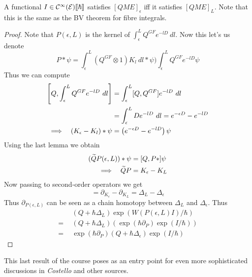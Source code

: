\begin{prop}
  A functional $I \in \mathcal{C}^{\infty}({\mathcal{E}})\llbracket\hbar\rrbracket$ satisfies $[QME]_\epsilon$ iff it satisfies $[QME]_L$. Note that this is the same as the BV theorem for fibre integrals.
\begin{proof}
  Note that $P(\epsilon,L)$ is the kernel of $\int_\epsilon^L Q^{GF} e^{-lD} \ dl$. Now this let's us denote
  \begin{equation}
    P * \psi = \int_\epsilon^L (Q^{GF} \otimes 1) K_l \ dl * \psi ) \int_\epsilon^L Q^{GF} e^{-lD} \psi
  \end{equation}
  Thus we can compute
  \begin{align}
    \left[Q, \int_\epsilon^L Q^{GF} e^{-lD} \ dl \right] &= \int_\epsilon^L [Q,Q^{GF}] e^{-lD} \ dl \\
    &= \int_\epsilon^L D e^{-lD} \ dl = e^{-\epsilon D} - e^{-l D} \\
    \Lra \quad (K_\epsilon - K_l) * \psi &= \left( e^{-\epsilon D} - e^{-l D} \right) \psi
  \end{align}
  Using the last lemma we obtain
  \begin{align}
    (\widetilde{Q} P(\epsilon,L)) * \psi &= [Q, P *] \psi \\
    \Lra \quad \widetilde{Q} P &= K_\epsilon - K_L
  \end{align}
  Now passing to second-order operators we get
  \begin{equation}
    [Q, \partial_{P(\epsilon,L)}] = \partial_{K_\epsilon} - \partial_{K_L} = \Delta_L - \Delta_\epsilon
  \end{equation}
  Thus $\partial_{P(\epsilon,L)}$ can be seen as a chain homotopy between $\Delta_L$ and $\Delta_\epsilon$. Thus
  \begin{align}
    &(Q + \hbar \Delta_L) \exp(W(P(\epsilon,L)I)/\hbar)\\
    = \ \ &(Q + \hbar \Delta_L) (\exp(\hbar \partial_P) \exp(I/\hbar))\\
    = \ \ &\exp(\hbar \partial_P) (Q + \hbar \Delta_\epsilon) \exp(I/\hbar)
  \end{align}
\end{proof}

\end{prop}

This last result of the course poses as an entry point for even more sophisticated discussions in \textit{Costello} \cite{Costello} and other sources.

~\\
